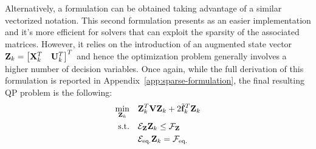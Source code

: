 \documentclass[../main.tex]{subfiles}
\begin{document}
Alternatively, a  formulation can be obtained taking advantage of a
similar vectorized notation. This second formulation presents as an easier
implementation and it's more efficient for solvers that can exploit the sparsity
of the associated matrices.
	However, it relies on the introduction of an augmented state vector
	$\mathbf{Z}_k = \begin{bmatrix} \mathbf{X}_k^T & \mathbf{U}_k^T \end{bmatrix}^T$ and
	hence the optimization problem generally involves a higher number of
	decision variables. Once again, while the full derivation of this
	formulation is reported in Appendix~\ref{app:sparse-formulation}, the final resulting QP problem is the following:
\begin{equation}
	\begin{aligned}
		\min_{\mathbf{Z}_k} \quad & \mathbf{Z}_k^T \mathbf{V} \mathbf{Z}_k + 2
		\tilde{\mathbf{f}}_k^T
		\mathbf{Z}_k\\
		\text{s.t.} \quad & \mathcal{E}_{\mathbf{Z}} \mathbf{Z}_k \leq \mathcal{F}_{\mathbf{Z}}\\
		& \mathcal{E}_{\text{eq.}} \mathbf{Z}_k = \mathcal{F}_{\text{eq.}}
	\end{aligned}
\end{equation}
\end{document}
